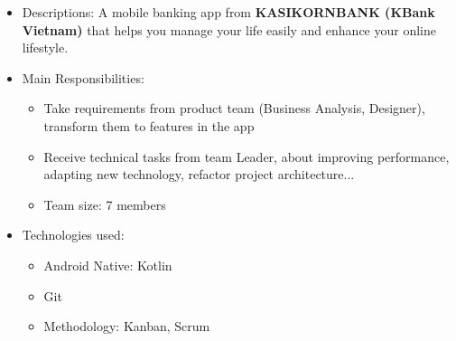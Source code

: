 \documentclass[margin, 10pt]{res}
\begin{document}
\begin{resume}
	\begin{itemize}
		\item Descriptions: A mobile banking app from {\bf KASIKORNBANK (KBank Vietnam)} that helps you manage your life easily and enhance your online lifestyle.
		\item Main Responsibilities:
		\begin{itemize}
   			\item Take requirements from product team (Business Analysis, Designer), transform them to features in the app
   			\item Receive technical tasks from team Leader, about improving performance, adapting new technology, refactor project architecture...
   			\item Team size: 7 members 
		\end{itemize}
			\item Technologies used:
		\begin{itemize}
			\item Android Native: Kotlin
			\item Git
			\item Methodology: Kanban, Scrum
		\end{itemize}
	\end{itemize}
   

\end{resume}
\end{document}
